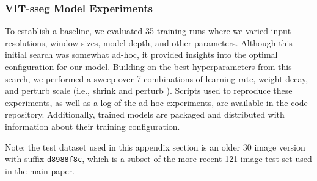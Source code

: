 \subsubsection{VIT-sseg Model Experiments}

To establish a baseline, we evaluated 35 training runs where we varied input resolutions, window sizes,
  model depth, and other parameters.
Although this initial search was somewhat ad-hoc, it provided insights into the optimal configuration for
  our model.
Building on the best hyperparameters from this search, we performed a sweep over 7 combinations of learning
  rate, weight decay, and perturb scale (i.e., shrink and perturb
  \cite{ash_warm_starting_2020,dohare_loss_2023}).
Scripts used to reproduce these experiments, as well as a log of the ad-hoc experiments, are available in
  the code repository.
Additionally, trained models are packaged and distributed with information about their training
  configuration.

Note:
the test dataset used in this appendix section is an older 30 image version with suffix {\tt d8988f8c},
  which is a subset of the more recent 121 image test set used in the main paper.


\newcommand{\VitResultCaption}{
\caption{
Results for the best-performing models on the validation set across 7 hyperparameter configurations.
The table provides detailed information about each configuration, including:
1) Configuration name (first column): a unique code identifying each training run used in the score scatter and box plots.
2) Varied hyperparameters (next three columns): specific values for learning rate, weight decay, and perturb scale that were used in each run.
3) Validation set performance (AP and AUC scores): metrics evaluating the model's performance on the validation set.
4) Test set performance (AP and AUC scores): metrics evaluating the model's performance on the test set using the same validation-maximizing models.
Note that the top AP score over all models on the test set was 0.65, but it did not correspond to one of these validation runs used for model selection.
Qualitative examples illustrating the performance of the top-scoring validation model listed here are provided in \cref{fig:test_heatmaps_with_best_vali_model}.
}
\label{tab:parameters_and_results}
}


